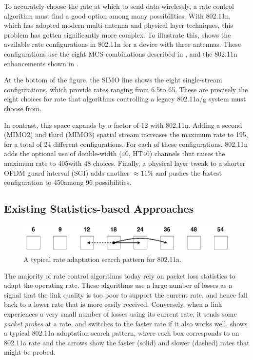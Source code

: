 To accurately choose the rate at which to send data wirelessly, a rate control algorithm must find a good option among many possibilities. With 802.11n, which has adopted modern multi-antenna and physical layer techniques, this problem has gotten significantly more complex. To illustrate this,  shows the available rate configurations in 802.11n for a device with three antennas. These configurations use the eight MCS combinations described in , and the 802.11n enhancements shown in .

At the bottom of the figure, the SIMO line shows the eight single-stream configurations, which provide rates ranging from 6.5\Mbps to 65\Mbps. These are precisely the eight choices for rate that algorithms controlling a legacy 802.11a/g system must choose from.

In contrast, this space expands by a factor of 12 with 802.11n. Adding a second (MIMO2) and third (MIMO3) spatial stream increases the maximum rate to 195\Mbps, for a total of 24 different configurations. For each of these configurations, 802.11n adds the optional use of double-width (40\MHz, HT40) channels that raises the maximum rate to 405\Mbps with 48 choices. Finally, a physical layer tweak to a shorter OFDM guard interval (SGI) adds another $\approx 11\%$ and pushes the fastest configuration to 450\Mbps among 96 possibilities.

\subsection{Existing Statistics-based Approaches}
\begin{figure}[t]
      \centering
      \includegraphics[scale=0.44]{figures/approach_figs/search_11a.pdf}
      \caption[Rate adaptation search pattern for 802.111]{\label{fig:search_11a}A typical rate adaptation search pattern for 802.11a.}
\end{figure}
The majority of rate control algorithms today rely on packet loss statistics to adapt the operating rate. These algorithms use a large number of losses as a signal that the link quality is too poor to support the current rate, and hence fall back to a lower rate that is more easily received. Conversely, when a link experiences a very small number of losses using its current rate, it sends some \emph{packet probes} at a rate, and switches to the faster rate if it also works well.  shows a typical 802.11a adaptation search pattern, where each box corresponds to an 802.11a rate and the arrows show the faster (solid) and slower (dashed) rates that might be probed.

